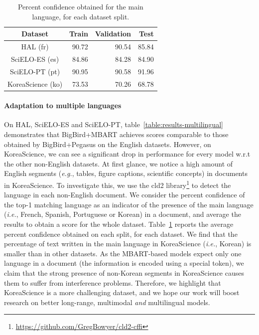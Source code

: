 \begin{table}
\centering
\small
\begin{tabular}{crrr}
\toprule
\textbf{Dataset} & \textbf{Train} & \textbf{Validation} & \textbf{Test} \\
\midrule
HAL (fr)                                 & 90.72                     & 90.54                          & 85.84                    \\
SciELO-ES (es)                            & 84.86                     & 84.28                          & 84.90                    \\
SciELO-PT (pt)                           & 90.95                     & 90.58                          & 91.96                    \\
KoreaScience (ko) & 73.53                     & 70.26                          & 68.78       \\            
\bottomrule
\end{tabular}
\caption{Percent confidence obtained for the main language, for each dataset split.}
\label{tablepercentage-main-lang}
\end{table}

\paragraph{Adaptation to multiple languages} On HAL, SciELO-ES and SciELO-PT, table~\ref{table:results-multilingual} demonstrates that BigBird+MBART achieves scores comparable to those obtained by BigBird+Pegasus on the English datasets. However, on KoreaScience, we can see a significant drop in performance for every model w.r.t the other non-English datasets. At first glance, we notice a high amount of English segments (\textit{e.g.}, tables, figure captions, scientific concepts) in documents in KoreaScience. To investigate this, we use the cld2 library\footnote{\url{https://github.com/GregBowyer/cld2-cffi}} to detect the language in each non-English document. We consider the percent confidence of the top-1 matching language as an indicator of the presence of the main language (\textit{i.e.}, French, Spanish, Portuguese or Korean) in a document, and average the results to obtain a score for the whole dataset. Table~\ref{tablepercentage-main-lang} reports the average percent confidence obtained on each split, for each dataset. We find that the percentage of text written in the main language in KoreaScience (\textit{i.e.}, Korean) is smaller than in other datasets. As the MBART-based models expect only one language in a document (the information is encoded using a special token), we claim that the strong presence of non-Korean segments in KoreaScience causes them to suffer from interference problems. Therefore, we highlight that KoreaScience is a more challenging dataset, and we hope our work will boost research on better long-range, multimodal \textit{and} multilingual models.



